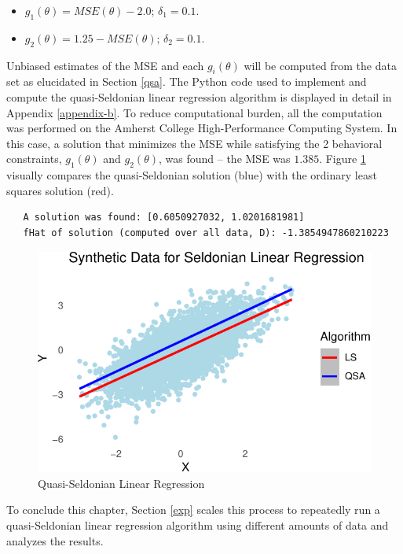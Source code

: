 \documentclass[12pt, twoside]{amherstthesis}
\begin{document}
\begin{itemize}
\item
  \(g_1(\theta) = MSE(\theta) - 2.0 \text{; } \delta_1 = 0.1\).
\item
  \(g_2(\theta) = 1.25 - MSE(\theta) \text{; } \delta_2 = 0.1\).
\end{itemize}
Unbiased estimates of the MSE and each \(g_i(\theta)\) will be computed from the data set as elucidated in Section \ref{qsa}. The Python code used to implement and compute the quasi-Seldonian linear regression algorithm is displayed in detail in Appendix \ref{appendix-b}. To reduce computational burden, all the computation was performed on the Amherst College High-Performance Computing System. In this case, a solution that minimizes the MSE while satisfying the 2 behavioral constraints, \(g_1(\theta)\) and \(g_2(\theta)\), was found -- the MSE was \(1.385\). Figure \ref{fig:fig3} visually compares the quasi-Seldonian solution (blue) with the ordinary least squares solution (red).
\begin{verbatim}
   A solution was found: [0.6050927032, 1.0201681981]
   fHat of solution (computed over all data, D): -1.3854947860210223
\end{verbatim}
\begin{figure}

{\centering \includegraphics{Dasha-Asienga_StatThesis_files/figure-latex/fig3-1} 

}

\caption{Quasi-Seldonian Linear Regression}\label{fig:fig3}
\end{figure}
To conclude this chapter, Section \ref{exp} scales this process to repeatedly run a quasi-Seldonian linear regression algorithm using different amounts of data and analyzes the results.
\end{document}
